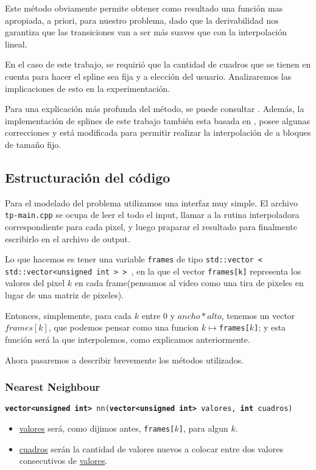 Este método obviamente permite obtener como resultado una función mas apropiada, a priori, para nuestro problema, dado que la derivabilidad nos garantiza que las transiciones van a ser más suaves que con la interpolación lineal.

En el caso de este trabajo, se requirió que la cantidad de cuadros que se tienen en cuenta para hacer el spline sea fija y a elección del usuario. Analizaremos las implicaciones de esto en la experimentación.

Para una explicación más profunda del método, se puede consultar \cite{burden}. Además, la implementación de splines de este trabajo también esta basada en \cite{burden}, posee algunas correcciones y está modificada para permitir realizar la interpolación de a bloques de tamaño fijo.


\subsection{Estructuración del código}

Para el modelado del problema utilizamos una interfaz muy simple. El archivo \texttt{tp-main.cpp} se ocupa de leer el todo el input, llamar a la rutina interpoladora correspondiente para cada pixel, y luego praparar el resultado para finalmente escribirlo en el archivo de output.

Lo que hacemos es tener una variable \texttt{frames} de tipo \texttt{std::vector < std::vector<unsigned int > {} > }, en la que el vector \texttt{frames[k]} representa los valores del pixel $k$ en cada frame(pensamos al video como una tira de pixeles en lugar de una matriz de pixeles).


Entonces, simplemente, para cada $k$ entre 0 y $ancho * alto$, tenemos un vector $frames[k]$, que podemos pensar como una funcion $ k \mapsto $\texttt{frames[$k$]}; y esta función será la que interpolemos, como explicamos anteriormente.

Ahora pasaremos a describir brevemente los métodos utilizados.


\subsubsection{Nearest Neighbour}
\texttt{\textbf{vector<unsigned int>} nn(\textbf{vector<unsigned int>} valores, \textbf{int} cuadros)}

\begin{itemize}
    \item  \underline{valores} será, como dijimos antes, \texttt{frames[$k$]}, para algun $k$.
    \item \underline{cuadros} serán la cantidad de valores nuevos a colocar entre dos valores consecutivos de \underline{valores}.
\end{itemize}

